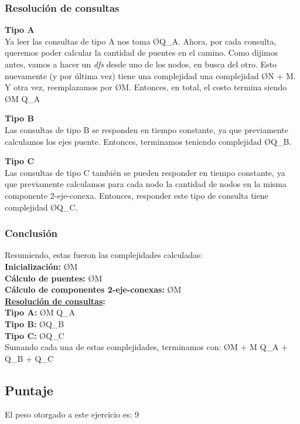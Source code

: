 \subsubsection{Resolución de consultas}
\noindent
\textbf{Tipo A}\\
\noindent
Ya leer las consultas de tipo A nos toma \O{Q_A}. Ahora, por cada consulta, queremos poder calcular la cantidad de puentes en el camino. Como dijimos antes, vamos a hacer un \textit{dfs} desde uno de los nodos, en busca del otro. Esto nuevamente (y por última vez) tiene una complejidad una complejidad \O{N + M}. Y otra vez, reemplazamos por \O{M}. Entonces, en total, el costo termina siendo \O{M Q_A}

\hfill \break \noindent
\textbf{Tipo B}\\
\noindent
Las consultas de tipo B se responden en tiempo constante, ya que previamente calculamos los ejes puente. Entonces, terminamos teniendo complejidad \O{Q_B}.

\hfill \break \noindent
\textbf{Tipo C}\\
\noindent
Las consultas de tipo C también se pueden responder en tiempo constante, ya que previamente calculamos para cada nodo la cantidad de nodos en la misma componente 2-eje-conexa. Entonces, responder este tipo de consulta tiene complejidad \O{Q_C}.


\subsubsection{Conclusión}
\noindent
Resumiendo, estas fueron las complejidades calculadas:\\
\textbf{Inicialización:} \O{M}\\
\textbf{Cálculo de puentes:} \O{M}\\
\textbf{Cálculo de componentes 2-eje-conexas:} \O{M}\\
\textbf{\underline{Resolución de consultas}:}\\
\textbf{  Tipo A:} \O{M Q_A}\\
\textbf{  Tipo B:} \O{Q_B}\\
\textbf{  Tipo C:} \O{Q_C}\\

\noindent
Sumando cada una de estas complejidades, terminamos con: \O{M + M Q_A + Q_B + Q_C}

\subsection{Puntaje}
El peso otorgado a este ejercicio es: 9



